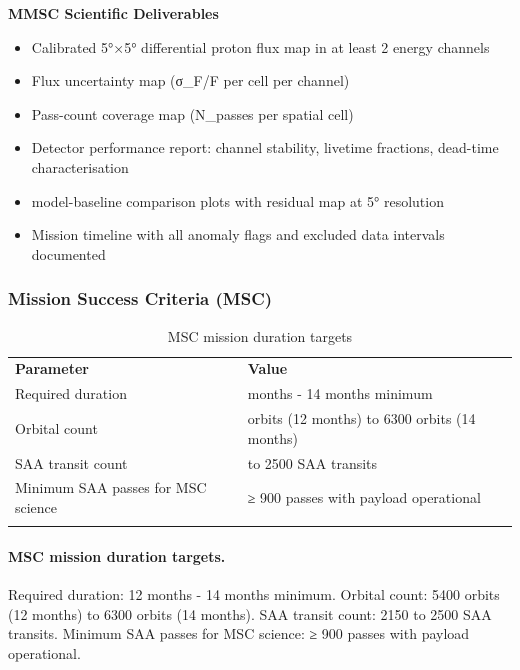 \textbf{MMSC Scientific Deliverables}

\begin{itemize}
\item
  Calibrated 5°×5° differential proton flux map in at least 2 energy
  channels
\item
  Flux uncertainty map (σ\_F/F per cell per channel)
\item
  Pass-count coverage map (N\_passes per spatial cell)
\item
  Detector performance report: channel stability, livetime fractions,
  dead-time characterisation
\item
  model-baseline comparison plots with residual map at 5° resolution
\item
  Mission timeline with all anomaly flags and excluded data intervals
  documented
\end{itemize}

\subsubsection{Mission Success Criteria (MSC)}\label{mission-success-criteria-msc}\ifrequirementsedition
\begin{longtable}{@{}
  >{\raggedright\arraybackslash}p{}
  >{\raggedright\arraybackslash}p{}@{}}
\caption{MSC mission duration targets}\label{tab:01-mission-context-4}\\
\toprule\noalign{}
\textbf{Parameter} & \textbf{Value} \\
Required duration & 12 months - 14 months minimum \\
Orbital count & 5400 orbits (12 months) to 6300 orbits (14 months) \\
SAA transit count & 2150 to 2500 SAA transits \\
Minimum SAA passes for MSC science & ≥ 900 passes with payload operational \\
\midrule\noalign{}
\endhead
\bottomrule\noalign{}
\endlastfoot
\end{longtable}
\else
\paragraph{MSC mission duration targets.} Required duration: 12 months - 14 months minimum. Orbital count: 5400 orbits (12 months) to 6300 orbits (14 months). SAA transit count: 2150 to 2500 SAA transits. Minimum SAA passes for MSC science: ≥ 900 passes with payload operational.
\fi

